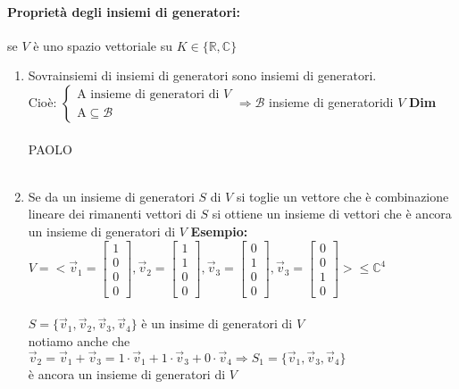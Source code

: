 \paragraph{Proprietà degli insiemi di generatori:} se $V$ è uno spazio vettoriale su 
$K\in\{\mathbb{R}, \mathbb{C}\}$ 
\begin{enumerate}
    \item Sovrainsiemi di insiemi di generatori sono insiemi di generatori. \\
        Cioè: 
        $ 
        \begin{cases}
            \textrm{A insieme di generatori di } V\\
            \textrm{A} \subseteq \mathcal{B}
        \end{cases}
        \Longrightarrow \mathcal{B}
        $
        insieme di generatoridi $V$
        \textbf{Dim}
        {\color{purple}\\\\PAOLO\\\\} 
    \item Se da un insieme di generatori $S$ di $V$ si toglie un vettore che è 
        combinazione lineare dei rimanenti vettori di $S$ si ottiene un insieme 
        di vettori che è ancora un insieme di generatori di $V$
        \textbf{Esempio:}\\
        $V=< 
        \vec{v}_1=
        \begin{bmatrix}
            1\\0\\0\\0
        \end{bmatrix}
        ,
        \vec{v}_2=
        \begin{bmatrix}
            1\\1\\0\\0
        \end{bmatrix}
        ,
        \vec{v}_3=
        \begin{bmatrix}
            0\\1\\0\\0
        \end{bmatrix}
        ,
        \vec{v}_3=
        \begin{bmatrix}
            0\\0\\1\\0
        \end{bmatrix}
        >\leq \mathbb{C}^4
        $\\
        \\
        $S=\{\vec{v}_1,\vec{v}_2, \vec{v}_3, \vec{v}_4\}$ 
        è un insime di generatori di $V$\\
        notiamo anche che \\
        $\vec{v}_2=\vec{v}_1+\vec{v}_3=1\cdot\vec{v}_1+1\cdot\vec{v}_3+0\cdot\vec{v}_4 
        \Longrightarrow
        S_1=\{\vec{v}_1, \vec{v}_3, \vec{v}_4\}$\\ è ancora un insieme di generatori di $V$
        \color{blue}

\end{enumerate}
